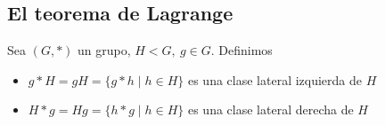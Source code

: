 
	

%


\subsection{El teorema de Lagrange}

\begin{dfn}
	Sea $(G, \ast)$ un grupo, $H < G,\ g \in G$. Definimos
	\begin{itemize}
		\item $g \ast H = gH = \{g \ast h \mid h \in H\}$ es una clase lateral izquierda de $H$
		\item $H \ast g = Hg = \{h \ast g \mid h \in H\}$ es una clase lateral derecha de $H$
	\end{itemize}
\end{dfn}

